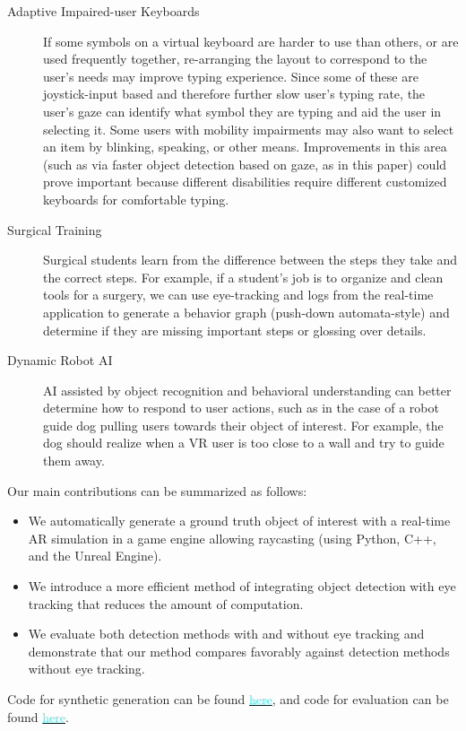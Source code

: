 \begin{description}
    \item[Adaptive Impaired-user Keyboards]
        If some symbols on a virtual keyboard are harder to use than others, or
        are used frequently together, re-arranging the layout to correspond to
        the user's needs may improve typing experience. Since some of these are
        joystick-input based and therefore further slow user's typing rate, the
        user's gaze can identify what symbol they are typing and aid the user in
        selecting it. Some users with mobility impairments may also want to
        select an item by blinking, speaking, or other means. Improvements in
        this area (such as via faster object detection based on gaze, as in this
        paper) could prove important because different disabilities require
        different customized keyboards for comfortable typing.
    \item[Surgical Training]
        Surgical students learn from the difference between the steps they take
        and the correct steps. For example, if a student's job is to organize
        and clean tools for a surgery, we can use eye-tracking and logs from the
        real-time application to generate a behavior graph (push-down
        automata-style) and determine if they are missing important steps or
        glossing over details.
    \item[Dynamic Robot AI]
        AI assisted by object recognition and behavioral understanding can
        better determine how to respond to user actions, such as in the case of
        a robot guide dog pulling users towards their object of interest. For
        example, the dog should realize when a VR user is too close to a wall
        and try to guide them away.
\end{description}

Our main contributions can be summarized as follows:

\begin{itemize}
    \item
        We automatically generate a ground truth object of interest with a
        real-time AR simulation in a game engine allowing raycasting
        (using Python, C++, and the Unreal Engine).
    \item
        We introduce a more efficient method of integrating object detection
        with eye tracking that reduces the amount of computation.
    \item
        We evaluate both detection methods with and without eye tracking and
        demonstrate that our method compares favorably against detection methods
        without eye tracking.
\end{itemize}

Code for synthetic generation can be found
\href{https://github.com/nrewkowski/COMP755FinalProject}{\textcolor{cyan}{here}},
and code for evaluation can be found
\href{https://github.com/FloralZhao/Comp755Project}{\textcolor{cyan}{here}}.
